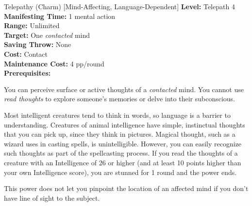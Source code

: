 {Telepathy (Charm) [Mind-Affecting, Language-Dependent]}
{
	\textbf{Level:}
	Telepath 4\\
	\textbf{Manifesting Time:}
	1 mental action\\
	\textbf{Range:}
	Unlimited\\
	\textbf{Target:}
	One \emph{contacted} mind\\
	\textbf{Saving Throw:}
	None\\
	\textbf{Cost:}
	Contact\\
	\textbf{Maintenance Cost:}
	4 pp/round\\
	\textbf{Prerequisites:}
	\\
}
{
	You can perceive surface or active thoughts of a \emph{contacted} mind. You cannot use \emph{read thoughts} to explore someone's memories or delve into their subconscious.

	Most intelligent creatures tend to think in words, so language is a barrier to understanding.  Creatures of animal intelligence have simple, instinctual thoughts that you can pick up, since they think in pictures. Magical thought, such as a wizard uses in casting spells, is unintelligible.  However, you can easily recognize such thoughts as part of the spellcasting process. If you read the thoughts of a creature with an Intelligence of 26 or higher (and at least 10 points higher than your own Intelligence score), you are stunned for 1 round and the power ends.

	This power does not let you pinpoint the location of an affected mind if you don't have line of sight to the subject.
}